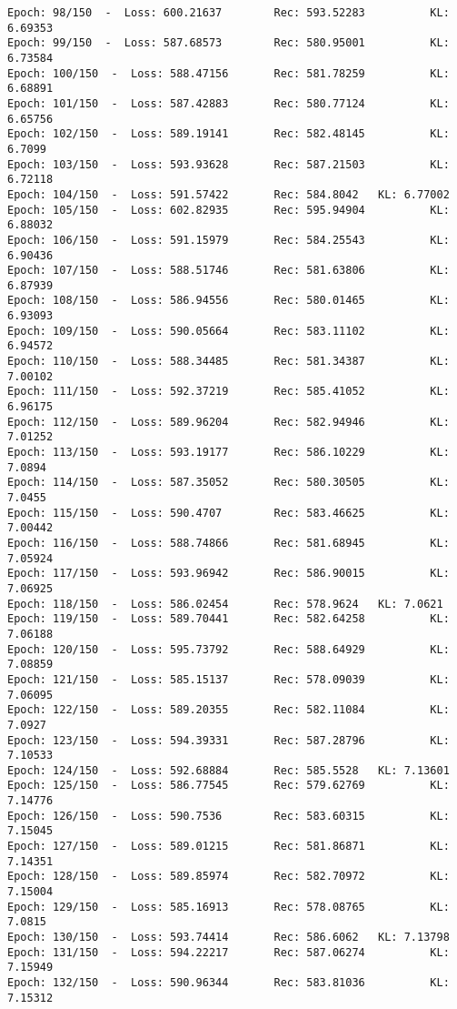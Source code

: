 \documentclass[11pt]{article}
\begin{document}
\begin{Verbatim}[commandchars=\\\{\}]
Epoch: 98/150  -  Loss: 600.21637        Rec: 593.52283          KL: 6.69353
Epoch: 99/150  -  Loss: 587.68573        Rec: 580.95001          KL: 6.73584
Epoch: 100/150  -  Loss: 588.47156       Rec: 581.78259          KL: 6.68891
Epoch: 101/150  -  Loss: 587.42883       Rec: 580.77124          KL: 6.65756
Epoch: 102/150  -  Loss: 589.19141       Rec: 582.48145          KL: 6.7099
Epoch: 103/150  -  Loss: 593.93628       Rec: 587.21503          KL: 6.72118
Epoch: 104/150  -  Loss: 591.57422       Rec: 584.8042   KL: 6.77002
Epoch: 105/150  -  Loss: 602.82935       Rec: 595.94904          KL: 6.88032
Epoch: 106/150  -  Loss: 591.15979       Rec: 584.25543          KL: 6.90436
Epoch: 107/150  -  Loss: 588.51746       Rec: 581.63806          KL: 6.87939
Epoch: 108/150  -  Loss: 586.94556       Rec: 580.01465          KL: 6.93093
Epoch: 109/150  -  Loss: 590.05664       Rec: 583.11102          KL: 6.94572
Epoch: 110/150  -  Loss: 588.34485       Rec: 581.34387          KL: 7.00102
Epoch: 111/150  -  Loss: 592.37219       Rec: 585.41052          KL: 6.96175
Epoch: 112/150  -  Loss: 589.96204       Rec: 582.94946          KL: 7.01252
Epoch: 113/150  -  Loss: 593.19177       Rec: 586.10229          KL: 7.0894
Epoch: 114/150  -  Loss: 587.35052       Rec: 580.30505          KL: 7.0455
Epoch: 115/150  -  Loss: 590.4707        Rec: 583.46625          KL: 7.00442
Epoch: 116/150  -  Loss: 588.74866       Rec: 581.68945          KL: 7.05924
Epoch: 117/150  -  Loss: 593.96942       Rec: 586.90015          KL: 7.06925
Epoch: 118/150  -  Loss: 586.02454       Rec: 578.9624   KL: 7.0621
Epoch: 119/150  -  Loss: 589.70441       Rec: 582.64258          KL: 7.06188
Epoch: 120/150  -  Loss: 595.73792       Rec: 588.64929          KL: 7.08859
Epoch: 121/150  -  Loss: 585.15137       Rec: 578.09039          KL: 7.06095
Epoch: 122/150  -  Loss: 589.20355       Rec: 582.11084          KL: 7.0927
Epoch: 123/150  -  Loss: 594.39331       Rec: 587.28796          KL: 7.10533
Epoch: 124/150  -  Loss: 592.68884       Rec: 585.5528   KL: 7.13601
Epoch: 125/150  -  Loss: 586.77545       Rec: 579.62769          KL: 7.14776
Epoch: 126/150  -  Loss: 590.7536        Rec: 583.60315          KL: 7.15045
Epoch: 127/150  -  Loss: 589.01215       Rec: 581.86871          KL: 7.14351
Epoch: 128/150  -  Loss: 589.85974       Rec: 582.70972          KL: 7.15004
Epoch: 129/150  -  Loss: 585.16913       Rec: 578.08765          KL: 7.0815
Epoch: 130/150  -  Loss: 593.74414       Rec: 586.6062   KL: 7.13798
Epoch: 131/150  -  Loss: 594.22217       Rec: 587.06274          KL: 7.15949
Epoch: 132/150  -  Loss: 590.96344       Rec: 583.81036          KL: 7.15312

\end{Verbatim}
\end{document}
